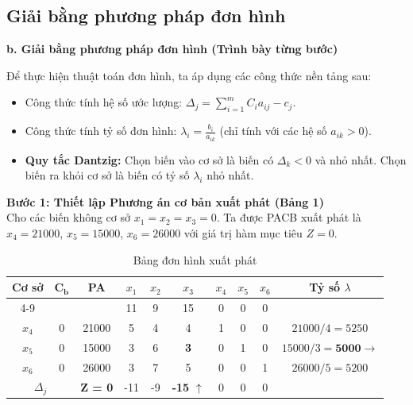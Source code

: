 \vspace{0.5cm}
\subsection{Giải bằng phương pháp đơn hình}
\textbf{b. Giải bằng phương pháp đơn hình (Trình bày từng bước)}

Để thực hiện thuật toán đơn hình, ta áp dụng các công thức nền tảng sau:
\begin{itemize}
    \item Công thức tính hệ số ước lượng: $\Delta_j = \sum_{i=1}^{m} C_i a_{ij} - c_j$.
    \item Công thức tính tỷ số đơn hình: $\lambda_i = \frac{b_i}{a_{ik}}$ (chỉ tính với các hệ số $a_{ik} > 0$).
    \item \textbf{Quy tắc Dantzig:} Chọn biến vào cơ sở là biến có $\Delta_k < 0$ và nhỏ nhất. Chọn biến ra khỏi cơ sở là biến có tỷ số $\lambda_i$ nhỏ nhất.
\end{itemize}

\textbf{Bước 1: Thiết lập Phương án cơ bản xuất phát (Bảng 1)} \\
Cho các biến không cơ sở $x_1 = x_2 = x_3 = 0$. Ta được PACB xuất phát là $x_4 = 21000$, $x_5 = 15000$, $x_6 = 26000$ với giá trị hàm mục tiêu $Z = 0$.

\begin{table}[htbp]
    \centering
    \renewcommand{\arraystretch}{1.3}
    \begin{tabular}{|c|c|c|c|c|c|c|c|c|c|}
        \hline
        \multirow{2}{*}{\textbf{Cơ sở}} & \multirow{2}{*}{$\mathbf{C_b}$} & \multirow{2}{*}{\textbf{PA}} & $x_1$ & $x_2$ & $x_3$ & $x_4$ & $x_5$ & $x_6$ & \multirow{2}{*}{\textbf{Tỷ số $\lambda$}} \\
        \cline{4-9}
        & & & 11 & 9 & 15 & 0 & 0 & 0 & \\
        \hline
        $x_4$ & 0 & 21000 & 5 & 4 & 4 & 1 & 0 & 0 & $21000/4 = 5250$ \\
        \hline
        $x_5$ & 0 & 15000 & 3 & 6 & \textbf{3} & 0 & 1 & 0 & $15000/3 = \mathbf{5000} \rightarrow$ \\
        \hline
        $x_6$ & 0 & 26000 & 3 & 7 & 5 & 0 & 0 & 1 & $26000/5 = 5200$ \\
        \hline
        \multicolumn{2}{|c|}{$\Delta_j$} & \textbf{Z = 0} & -11 & -9 & \textbf{-15} $\uparrow$ & 0 & 0 & 0 & \\
        \hline
    \end{tabular}
    \caption{Bảng đơn hình xuất phát}
\end{table}

